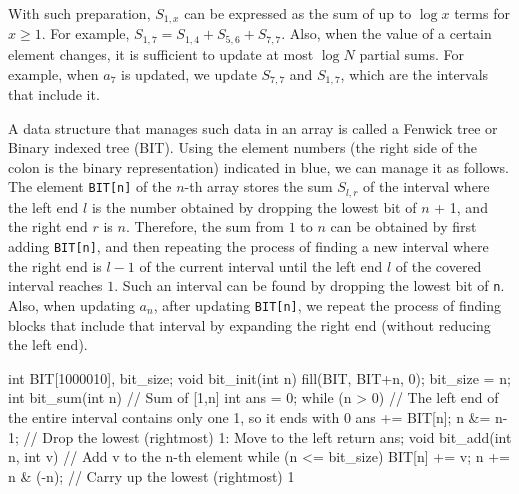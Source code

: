 With such preparation, $S_{1,x}$ can be expressed as the sum of up to $\log x$ terms for $x \ge 1$. For example, $S_{1,7} = S_{1,4}+S_{5,6}+S_{7,7}$.
Also, when the value of a certain element changes, it is sufficient to update at most $\log N$ partial sums. For example, when $a_7$ is updated, we update $S_{7,7}$ and $S_{1,7}$, which are the intervals that include it.

A data structure that manages such data in an array is called a Fenwick tree or Binary indexed tree (BIT). Using the element numbers (the right side of the colon is the binary representation) indicated in blue, we can manage it as follows.
The element \texttt{BIT[n]} of the $n$-th array stores the sum $S_{l,r}$ of the interval where the left end $l$ is the number obtained by dropping the lowest bit of $n$ + 1, and the right end $r$ is $n$.
Therefore, the sum from $1$ to $n$ can be obtained by first adding \texttt{BIT[n]}, and then repeating the process of finding a new interval where the right end is $l-1$ of the current interval until the left end $l$ of the covered interval reaches $1$. Such an interval can be found by dropping the lowest bit of \texttt{n}. Also, when updating $a_n$, after updating \texttt{BIT[n]}, we repeat the process of finding blocks that include that interval by expanding the right end (without reducing the left end).

\begin{cbox}
int BIT[1000010], bit_size;
void bit_init(int n) {
    fill(BIT, BIT+n, 0); 
    bit_size = n;
}
int bit_sum(int n) { // Sum of [1,n]
  int ans = 0;
  while (n > 0) { // The left end of the entire interval contains only one 1, so it ends with 0
    ans += BIT[n];
    n &= n-1; // Drop the lowest (rightmost) 1: Move to the left
  }
  return ans;
}
void bit_add(int n, int v) { // Add v to the n-th element
  while (n <= bit_size) {
    BIT[n] += v;
    n += n & (-n); // Carry up the lowest (rightmost) 1
  }
}  
\end{cbox}

